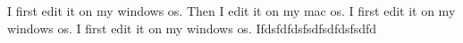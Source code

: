 I first edit it on my windows os.
Then I edit it on my mac os.
I first edit it on my windows os.
I first edit it on my windows os.
Ifdsfdfdsfsdfsdfdsfsdfd
